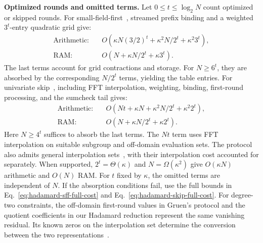 \smallskip\noindent\textbf{Optimized rounds and omitted terms.}
Let \(0\leq t\leq\log_2N\) count optimized or skipped rounds.
For small-field-first~\cite{iacr/BagadDT24,iacr/BagadDDT25,iacr/DaoDBDT26},
streamed prefix binding and a weighted \(3^t\)-entry quadratic grid give:
\begin{equation}
\begin{aligned}
\text{Arithmetic:}\quad&
O\!\left(\kappa N(3/2)^t+\kappa^2N/2^t+\kappa^2 3^t\right),\\
\text{RAM:}\quad& O\!\left(N+\kappa N/2^t+\kappa 3^t\right).
\end{aligned}
\label{eq:hadamard-sff-full-cost}
\end{equation}
The last terms account for grid contractions and storage.
For \(N\geq6^t\), they are absorbed by the corresponding
\(N/2^t\) terms, yielding the table entries.
For univariate skip~\cite{iacr/Gruen24}, including FFT interpolation,
weighting, binding, first-round processing, and the sumcheck tail gives:
\begin{equation}
\begin{aligned}
\text{Arithmetic:}\quad&
O\!\left(Nt+\kappa N+\kappa^2N/2^t+\kappa^2 2^t\right),\\
\text{RAM:}\quad& O\!\left(N+\kappa N/2^t+\kappa 2^t\right).
\end{aligned}
\label{eq:hadamard-skip-full-cost}
\end{equation}
Here \(N\geq4^t\) suffices to absorb the last terms.
The \(Nt\) term uses FFT interpolation on suitable subgroup
and off-domain evaluation sets. The protocol also admits general
interpolation sets~\cite[Section~5.1, footnote~18]{iacr/Gruen24},
with their interpolation cost accounted for separately. When supported,
\(2^t=\Theta(\kappa)\) and \(N=\Omega(\kappa^2)\) give
\(O(\kappa N)\) arithmetic and \(O(N)\) RAM.
For \(t\) fixed by \(\kappa\), the omitted terms are independent of
\(N\). If the absorption conditions fail, use the full bounds in
Eq.~\eqref{eq:hadamard-sff-full-cost} and
Eq.~\eqref{eq:hadamard-skip-full-cost}.
For degree-two constraints, the off-domain first-round values in
Gruen's protocol and the quotient coefficients in our Hadamard
reduction represent the same vanishing residual. Its known zeros
on the interpolation set determine the conversion between the two
representations~\cite[Section~6]{iacr/Gruen24}.

